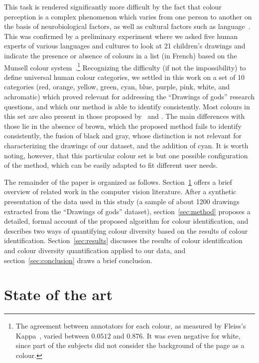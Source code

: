 \documentclass[11pt,a4paper]{article}
\begin{document}
This task is rendered significantly more difficult by the fact that colour perception is a complex phenomenon which varies from one person to another on the basis of neurobiological factors, as well as cultural factors such as language~\cite[][pp. 35 and 87]{pastoureau2017}. This was confirmed by a preliminary experiment where we asked five human experts of various languages and cultures to look at 21 children's drawings and indicate the presence or absence of colours in a list (in French) based on the Munsell colour system~\cite{Munsell1912}.\footnote{The agreement between annotators for each colour, as measured by Fleiss's Kappa~\cite{Fleiss1971}, varied between $0.0512$ and $0.876$. It was even negative for white, since part of the subjects did not consider the background of the page as a colour.} Recognizing the difficulty (if not the impossibility) to define universal human colour categories, we settled in this work on a set of 10 categories (red, orange, yellow, green, cyan, blue, purple, pink, white, and achromatic) which proved relevant for addressing the ``Drawings of gods'' research questions, and which our method is able to identify consistently. Most colours in this set are also present in those proposed by~\citet{berlinkay1969} and \citet{pastoureau2017}. The main differences with those lie in the absence of brown, which the proposed method fails to identify consistently, the fusion of black and gray, whose distinction is not relevant for characterizing the drawings of our dataset, and the addition of cyan. It is worth noting, however, that this particular colour set is but one possible configuration of the method, which can be easily adapted to fit different user needs.

The remainder of the paper is organized as follows. Section~\ref{sec:state_of_the_art} offers a brief overview of related work in the computer vision literature. After a synthetic presentation of the data used in this study (a sample of about 1200 drawings extracted from the ``Drawings of gods'' dataset), section~\ref{sec:method} proposes a detailed, formal account of the proposed algorithm for colour identification, and describes two ways of quantifying colour diversity based on the results of colour identification. Section~\ref{sec:results} discusses the results of colour identification and colour diversity quantification applied to our data, and section~\ref{sec:conclusion} draws a brief conclusion.


\section{State of the art}
\label{sec:state_of_the_art}
\end{document}

